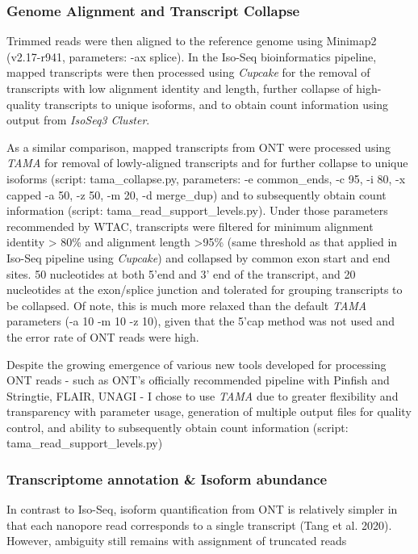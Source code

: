 \subsubsection{Genome Alignment and Transcript Collapse}
Trimmed reads were then aligned to the reference genome using Minimap2 \cite{Li2018} (v2.17-r941, parameters: -ax splice). In the Iso-Seq bioinformatics pipeline, mapped transcripts were then processed using \textit{Cupcake} for the removal of transcripts with low alignment identity and length, further collapse of high-quality transcripts to unique isoforms, and to obtain count information using output from \textit{IsoSeq3 Cluster}.

As a similar comparison, mapped transcripts from ONT were processed using \textit{TAMA} for removal of lowly-aligned transcripts and for further collapse to unique isoforms (script: tama\_collapse.py, parameters: -e common\_ends, -c 95, -i 80, -x capped -a 50, -z 50, -m 20, -d merge\_dup) and to subsequently obtain count information (script: tama\_read\_support\_levels.py). Under those parameters recommended by WTAC, transcripts were filtered for minimum alignment identity > 80\% and alignment length >95\% (same threshold as that applied in Iso-Seq pipeline using \textit{Cupcake}) and collapsed by common exon start and end sites. 50 nucleotides at both 5'end and 3' end of the transcript, and 20 nucleotides at the exon/splice junction and tolerated for grouping transcripts to be collapsed. Of note, this is much more relaxed than the default \textit{TAMA} parameters (-a 10 -m 10 -z 10), given that the 5'cap method was not used and the error rate of ONT reads were high. 

Despite the growing emergence of various new tools developed for processing ONT reads - such as ONT's officially recommended pipeline with Pinfish and Stringtie, FLAIR, UNAGI - I chose to use \textit{TAMA} due to greater flexibility and transparency with parameter usage, generation of multiple output files for quality control, and ability to subsequently obtain count information (script: tama\_read\_support\_levels.py)



\subsubsection{Transcriptome annotation \& Isoform abundance } 
In contrast to Iso-Seq, isoform quantification from ONT is relatively simpler in that each nanopore read corresponds to a single transcript (Tang et al. 2020). However, ambiguity still remains with assignment of truncated reads 

